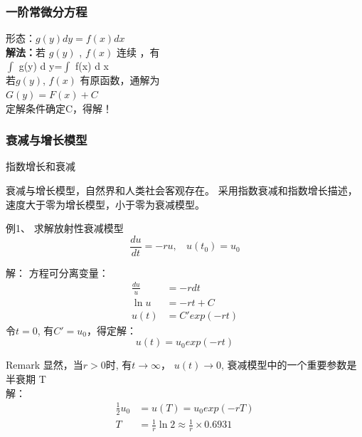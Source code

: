 \begin{frame}
	\frametitle{一阶常微分方程}
	{\large 形态：$g(y)dy=f(x)dx$ }\\ \vspace{0.6cm}
	\textbf{解法：}若 $g(y)$ , $f(x)$ 连续 ，有\\	\vspace{0.3cm}
   	{\large 	$\int$ g(y) d y=$\int$ f(x) d x }\\	\vspace{0.3cm}
	若$g(y)$, $f(x)$  有原函数，通解为\\	\vspace{0.3cm}
	{\large $G(y)=F(x)+C$}\\	\vspace{0.3cm}
	定解条件确定C，得解！
\end{frame}

\begin{frame}
\frametitle{衰减与增长模型}
	\begin{block}{指数增长和衰减}
	\begin{itemize}
		\IItem 衰减与增长模型，自然界和人类社会客观存在。
		\IItem 采用指数衰减和指数增长描述，
		\IItem 速度大于零为增长模型，小于零为衰减模型。
	\end{itemize}
	\end{block}
\end{frame}

\begin{frame}
	\begin{exampleblock} {例1、	求解放射性衰减模型}
	\begin{equation*}
	\frac{du}{dt}	= - ru, ~~~~ u(t_0) = u_0
	\end{equation*}
	\end{exampleblock} 	
	\alert{解：} 方程可分离变量：
	\begin{align*}
		\frac{du}{u} &= - rdt\\
		\ln u &=-rt+C\\
		u(t)&=C'exp(-rt)	
	\end{align*}
	令$t=0$, 有$C'=u_0$，得定解：
	\begin{equation*}
		u(t)=u_0 exp(-rt)
	\end{equation*}
\end{frame}


\begin{frame}
\begin{block} {Remark}
	显然，当$r>0$时, 有$t \to \infty$， $u(t) \to 0$,  衰减模型中的一个重要参数是半衰期 T\\
	\alert{解：} 
	\begin{align*}
	\frac{1}{2}u_0 &=u(T) =u_0 exp(-rT)\\
	T &=\frac{1}{r} \ln 2  \approx \frac{1}{r} \times 0.6931	
	\end{align*}
	\end{block}
\end{frame}

